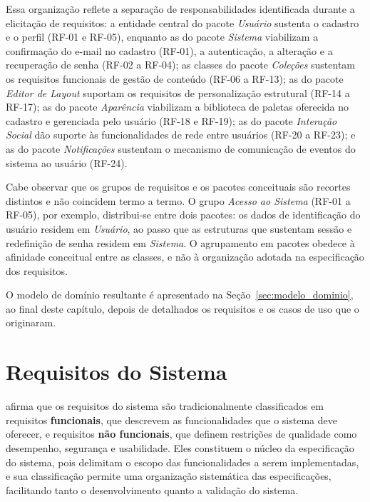 Essa organização reflete a separação de responsabilidades identificada durante
a elicitação de requisitos: a entidade central do pacote \textit{Usuário}
sustenta o cadastro e o perfil (RF-01 e RF-05), enquanto as do pacote
\textit{Sistema} viabilizam a confirmação do e-mail no cadastro (RF-01), a
autenticação, a alteração e a recuperação de senha (RF-02 a RF-04); as classes do pacote \textit{Coleções} sustentam os
requisitos funcionais de gestão de conteúdo (RF-06 a RF-13); as do pacote
\textit{Editor de Layout} suportam os requisitos de personalização estrutural
(RF-14 a RF-17); as do pacote \textit{Aparência} viabilizam a biblioteca de
paletas oferecida no cadastro e gerenciada pelo usuário (RF-18 e RF-19); as
do pacote \textit{Interação Social} dão suporte às funcionalidades de rede
entre usuários (RF-20 a RF-23); e as do pacote \textit{Notificações} sustentam
o mecanismo de comunicação de eventos do sistema ao usuário (RF-24).

Cabe observar que os grupos de requisitos e os pacotes conceituais são recortes
distintos e não coincidem termo a termo. O grupo \textit{Acesso ao Sistema}
(RF-01 a RF-05), por exemplo, distribui-se entre dois pacotes: os dados de
identificação do usuário residem em \textit{Usuário}, ao passo que as
estruturas que sustentam sessão e redefinição de senha residem em
\textit{Sistema}. O agrupamento em pacotes obedece à afinidade conceitual entre
as classes, e não à organização adotada na especificação dos requisitos.

O modelo de domínio resultante é apresentado na Seção~\ref{sec:modelo_dominio},
ao final deste capítulo, depois de detalhados os requisitos e os casos de uso
que o originaram.


\section{Requisitos do Sistema}

 afirma que os requisitos do sistema são tradicionalmente classificados em requisitos \textbf{funcionais}, 
que descrevem as funcionalidades que o sistema deve oferecer, e requisitos \textbf{não funcionais}, que definem restrições de qualidade como desempenho, 
segurança e usabilidade. Eles constituem o núcleo da especificação do sistema, pois delimitam o escopo das funcionalidades a serem implementadas, 
e sua classificação permite uma organização sistemática das especificações, facilitando tanto o desenvolvimento quanto a validação do sistema.

